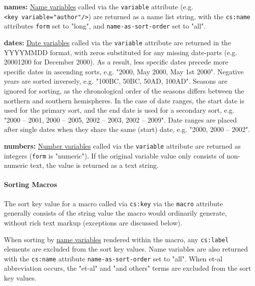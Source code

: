 \textbf{names:} \protect\hyperlink{name-variables}{Name variables}
called via the \texttt{variable} attribute (e.g.
\texttt{\textless{}key\ variable="author"/\textgreater{}}) are returned
as a name list string, with the \texttt{cs:name} attributes
\texttt{form} set to "long", and \texttt{name-as-sort-order} set to
"all".

\textbf{dates:} \protect\hyperlink{date-variables}{Date variables}
called via the \texttt{variable} attribute are returned in the YYYYMMDD
format, with zeros substituted for any missing date-parts (e.g. 20001200
for December 2000). As a result, less specific dates precede more
specific dates in ascending sorts, e.g. "2000, May 2000, May 1st 2000".
Negative years are sorted inversely, e.g. "100BC, 50BC, 50AD, 100AD".
Seasons are ignored for sorting, as the chronological order of the
seasons differs between the northern and southern hemispheres. In the
case of date ranges, the start date is used for the primary sort, and
the end date is used for a secondary sort, e.g. "2000 -- 2001, 2000 --
2005, 2002 -- 2003, 2002 -- 2009". Date ranges are placed after single
dates when they share the same (start) date, e.g. "2000, 2000 -- 2002".

\textbf{numbers:} \protect\hyperlink{number-variables}{Number variables}
called via the \texttt{variable} attribute are returned as integers
(\texttt{form} is "numeric"). If the original variable value only
consists of non-numeric text, the value is returned as a text string.

\hypertarget{sorting-macros}{%
\paragraph{Sorting Macros}\label{sorting-macros}}

The sort key value for a macro called via \texttt{cs:key} via the
\texttt{macro} attribute generally consists of the string value the
macro would ordinarily generate, without rich text markup (exceptions
are discussed below).

When sorting by \protect\hyperlink{name-variables}{name variables}
rendered within the macro, any \texttt{cs:label} elements are excluded
from the sort key values. Name variables are also returned with the
\texttt{cs:name} attribute \texttt{name-as-sort-order} set to "all".
When et-al abbreviation occurs, the "et-al" and "and others" terms are
excluded from the sort key values.

